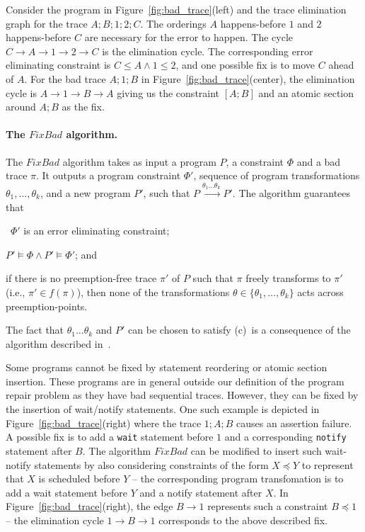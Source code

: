 \documentclass{llncs}
\newcommand\Prog{\ensuremath{\mathit{P}}}
\newcommand\ProgCons{\ensuremath{\Phi}}
\newcommand\trace{\pi}
\newcommand\FixBad{\mathit{FixBad}}
\newcommand\reorder{\theta}
\begin{document}
\begin{example}
Consider the program in Figure~\ref{fig:bad_trace}(left) and the trace
  elimination graph for the trace $A; B; 1; 2; C$.
  The orderings $A$ happens-before $1$ and $2$
  happens-before $C$ are necessary for the error to happen.
  The cycle $C \to A \to 1 \to 2 \to C$ is the elimination cycle.
  The corresponding error eliminating constraint is $C \leq
  A \wedge 1 \leq 2$, and one possible fix is to move $C$ ahead of $A$.
For the bad trace $A; 1; B$ in Figure~\ref{fig:bad_trace}(center), the
  elimination cycle is $A \to 1 \to B\to A$ giving us the 
  constraint $[ A; B]$ and an atomic section around $A; B$ as the
  fix.
\end{example}

\paragraph{The $\FixBad$ algorithm.}
The $\FixBad$ algorithm takes as input a program $\Prog$, a constraint
$\ProgCons$ and a bad trace $\trace$.
It outputs a program constraint $\ProgCons'$,
sequence of program transformations $\reorder_1,\ldots,\reorder_k$, and
a new program $\Prog'$, such that
$\Prog\xrightarrow{\reorder_1\ldots\reorder_k}\Prog'$.
The algorithm guarantees that
\begin{inparaenum}[(a)]
 \item~$\ProgCons'$ is an error eliminating constraint;
 \item $\Prog' \models \ProgCons \wedge \Prog' \models \ProgCons'$; and
 \item if there is no preemption-free trace $\trace'$ of $\Prog$ such
   that $\trace$ freely transforms to $\trace'$ (i.e., $\trace' \in
   f(\trace)$), then none of the transformations $\reorder \in
   \{\reorder_1,\ldots,\reorder_k\}$ acts across preemption-points.
\end{inparaenum}
The fact that $\reorder_1\ldots\reorder_k$ and $\Prog'$ can be chosen to
satisfy (c)~is a consequence of the algorithm described
in~\cite{cav2013}.

Some programs cannot be fixed by statement reordering or atomic section
insertion.
These programs are in general outside our definition of the program 
repair problem as they have bad sequential traces.
However, they can be fixed by the insertion of wait/notify
statements.
One such example is depicted in Figure~\ref{fig:bad_trace}(right) where the
trace $1; A; B$ causes an assertion failure.
A possible fix is to add a {\tt wait} statement before $1$ and a
corresponding {\tt notify} statement after $B$.
The algorithm $\FixBad$ can be modified to insert such wait-notify
statements by also considering constraints of the
form $X \preceq Y$ to represent that $X$ is scheduled before $Y$ -- the
corresponding program transfomation is to add a wait statement before
$Y$ and a notify statement after $X$.
In Figure~\ref{fig:bad_trace}(right), the edge $B \to 1$ represents such a
constraint $B \preceq 1$ -- the elimination cycle $1 \to B
\to 1$ corresponds to the above described fix.
\end{document}
